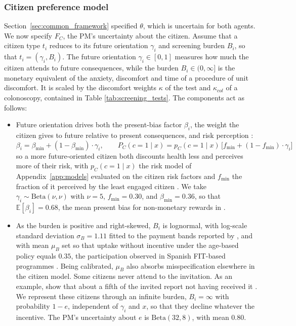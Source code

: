 \documentclass[12pt]{article}
\begin{document}
\subsubsection{Citizen preference model}\label{sec:citizen_model}

Section~\ref{sec:common_framework} specified $\theta$, which is uncertain for both agents. We now specify $F_C$, the PM's uncertainty about the citizen.  Assume that a citizen type $t_i$ reduces to its future orientation $\gamma_i$ and screening burden $B_i$, so that $t_i = (\gamma_i, B_i)$. The future orientation $\gamma_i \in [0,1]$ measures how much the citizen attends to future consequences, while the burden $B_i \in (0, \infty]$ is the monetary equivalent of the anxiety, discomfort and time of a procedure of unit discomfort. It is scaled by the discomfort weights $\kappa$ of the test and $\kappa_{col}$ of a colonoscopy, contained in Table \ref{tab:screening_tests}. The components act as follows:
\begin{itemize}
    \item Future orientation drives both the present-bias factor $\beta_i$, the weight the citizen gives to future relative to present consequences, and risk perception \citep{huf2021text}:
    \begin{equation*}
        \beta_i = \beta_{\min} + (1 - \beta_{\min}) \cdot \gamma_i, \qquad P_C(c=1 \mid x) = p_{C}(c=1 \mid x)\, \big[f_{\min} + (1 - f_{\min})\cdot \gamma_i\big]
    \end{equation*}
    so a more future-oriented citizen both discounts health less and perceives more of their risk, with $p_{C}(c = 1 \mid x)$ the risk model of Appendix~\ref{app:models} evaluated on the citizen risk factors and $f_{\min}$ the fraction of it perceived by the least engaged citizen \citep{le2023exploring}. We take $\gamma_i \sim \mathrm{Beta}(\nu,\nu)$ with $\nu = 5$, $f_{\min} = 0.30$, and $\beta_{\min}=0.36$, so that $\mathbb{E}[\beta_i] = 0.68$, the mean present bias for non-monetary rewards in \citet{cheung2026meta}.
    \item As the burden is positive and right-skewed, $B_i$ is lognormal, with log-scale standard deviation $\sigma_B = 1.11$ fitted to the payment bands reported by \citet{jonas2010willingness}, and with mean $\mu_B$ set so that uptake without incentive under the age-based policy equals $0.35$, the participation observed in Spanish FIT-based programmes \citep{binefa2016colorectal, portero2023uptake}. Being calibrated, $\mu_B$ also absorbs misspecification elsewhere in the citizen model. Some citizens never attend to the invitation. As an example, \citep{molina2014} show that about a fifth of the invited report not having received it . We represent these citizens through an infinite burden, $B_i = \infty$ with probability $1 - e$, independent of $\gamma_i$ and $x$, so that they decline whatever the incentive. The PM's uncertainty about $e$ is $\mathrm{Beta}(32, 8)$, with mean $0.80$. 
\end{itemize}
\end{document}
